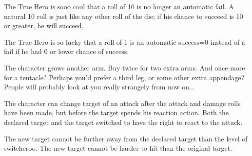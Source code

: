 %
%




 The True Hero is sooo cool that a roll of 10 is no longer an automatic fail. A natural 10 roll is just like any other roll of the die; if his chance to succeed is 10 or greater, he will succeed.


 The True Hero is so lucky that a roll of 1 is an automatic success=0 instead of a fail if he had 0 or lower chance of success.


 The character grows another arm. Buy twice for two extra arms. And once more for a tentacle? Perhaps you'd prefer a third leg, or some other extra appendage? People will probably look at you really strangely from now on...


 The character can change target of an attack after the attack and damage rolls have been made, but before the target spends his reaction action. Both the declared target and the target  switched to have the right to react to the attack.

The new target cannot be further away from the declared target than the level of switcheroo. The new target cannot be harder to hit than the original target.

